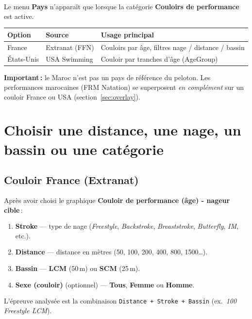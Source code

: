 \documentclass[11pt,a4paper]{article}
\begin{document}
Le menu \textbf{Pays} n'apparaît que lorsque la catégorie \textbf{Couloirs de performance} est active.

\begin{center}
\begin{tabular}{lll}
\hline
\textbf{Option} & \textbf{Source} & \textbf{Usage principal} \\
\hline
France & Extranat (FFN) & Couloirs par âge, filtres nage / distance / bassin \\
États-Unis & USA Swimming & Couloir par tranches d'âge (AgeGroup) \\
\hline
\end{tabular}
\end{center}

\noindent\textbf{Important\,:} le Maroc n'est pas un pays de référence du peloton. Les performances marocaines (FRM Natation) se superposent \emph{en complément} sur un couloir France ou USA (section~\ref{sec:overlay}).

\section{Choisir une distance, une nage, un bassin ou une catégorie}

\subsection{Couloir France (Extranat)}

Après avoir choisi le graphique \textbf{Couloir de performance (âge) - nageur cible}\,:

\begin{enumerate}
  \item \textbf{Stroke} --- type de nage (\emph{Freestyle}, \emph{Backstroke}, \emph{Breaststroke}, \emph{Butterfly}, \emph{IM}, etc.).
  \item \textbf{Distance} --- distance en mètres (50, 100, 200, 400, 800, 1500\ldots).
  \item \textbf{Bassin} --- \textbf{LCM} (50\,m) ou \textbf{SCM} (25\,m).
  \item \textbf{Sexe (couloir)} (optionnel) --- \textbf{Tous}, \textbf{Femme} ou \textbf{Homme}.
\end{enumerate}

\noindent L'épreuve analysée est la combinaison \texttt{Distance + Stroke + Bassin} (ex.\ \emph{100 Freestyle LCM}).
\end{document}
